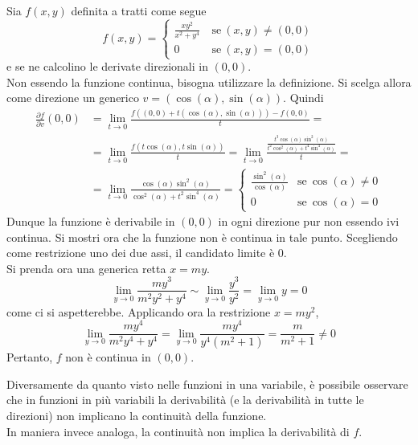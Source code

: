 \begin{example}
    Sia $f(x,y)$ definita a tratti come segue
    \begin{equation*}
        f(x,y)= \begin{cases}
            \frac{xy^2}{x^2+y^4}\ &\text{se}\ (x,y)\neq (0,0)\\
            0\ &\text{se}\ (x,y)=(0,0)
        \end{cases}
    \end{equation*}
   e se ne calcolino le derivate direzionali in $(0,0)$.\\
   Non essendo la funzione continua, bisogna utilizzare la definizione.
   Si scelga allora come direzione un generico $v=(\cos(\alpha), \sin(\alpha))$.
   Quindi
   \begin{equation*}
    \begin{aligned}
        \frac{\partial{f}}{\partial{v}}(0,0)&=\lim_{t \to 0}{\frac{f((0,0)+t(\cos(\alpha), \sin(\alpha)))-f(0,0)}{t}}=\\
        &=\lim_{t \to 0}{\frac{f(t\cos(\alpha), t\sin(\alpha))}{t}}= \lim_{t \to 0}{\frac{\frac{t^3\cos(\alpha)\sin^2(\alpha)}{t^2\cos^2(\alpha)+t^4\sin^4(\alpha)}}{t}}=\\
        &=\lim_{t \to 0}{\frac{\cos(\alpha)\sin^2(\alpha)}{\cos^2(\alpha)+t^2\sin^4(\alpha)}}= \begin{cases}
            \frac{\sin^2(\alpha)}{\cos(\alpha)} &\text{se}\ \cos(\alpha) \neq 0\\
            0 & \text{se}\ \cos(\alpha)=0
        \end{cases}
    \end{aligned}
   \end{equation*}
   Dunque la funzione è derivabile in $(0,0)$ in ogni direzione pur non essendo ivi continua. Si mostri ora che la funzione non è continua in tale punto.
   Scegliendo come restrizione uno dei due assi, il candidato limite è $0$.\\
   Si prenda ora una generica retta $x=my$.
   \begin{equation*}
    \lim_{y \to 0}{\frac{my^3}{m^2y^2+y^4}} \sim \lim_{y \to 0}{\frac{y^3}{y^2}}=\lim_{y\to0}{y}=0
   \end{equation*}
   come ci si aspetterebbe.
   Applicando ora la restrizione $x=my^2$,
   \begin{equation*}
    \lim_{y \to 0}{\frac{my^4}{m^2y^4+y^4}}=\lim_{y \to 0}{\frac{my^4}{y^4(m^2+1)}}=\frac{m}{m^2+1} \neq 0
   \end{equation*}
   Pertanto, $f$ non è continua in $(0,0)$.
\end{example}
\begin{oss}
    Diversamente da quanto visto nelle funzioni in una variabile, è possibile osservare che in funzioni in più variabili la derivabilità (e la derivabilità in tutte le direzioni) non implicano la continuità della funzione.\\
    In maniera invece analoga, la continuità non implica la derivabilità di $f$.
\end{oss}

